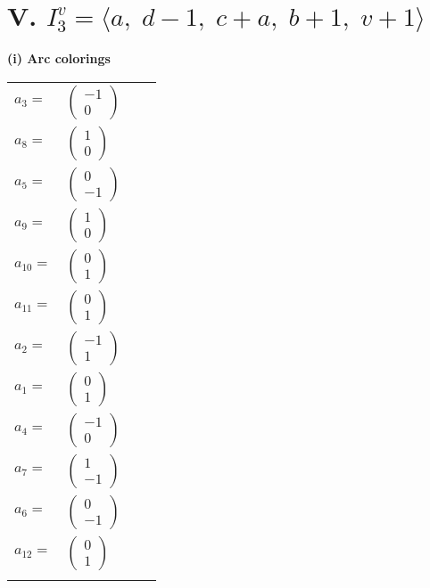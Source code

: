 \documentclass[1p]{elsarticle_modified}
\theoremstyle{definition}
\begin{document}
\centering \section*{V. $I^v_{3}= \langle a,\;d-1,\;c+a,\;b+1,\;v+1 \rangle$}
\flushleft \textbf{(i) Arc colorings}\\
\begin{tabular}{m{7pt} m{180pt} m{7pt} m{180pt} }
\flushright $a_{3}=$&$\begin{pmatrix}-1\\0\end{pmatrix}$ \\
\flushright $a_{8}=$&$\begin{pmatrix}1\\0\end{pmatrix}$ \\
\flushright $a_{5}=$&$\begin{pmatrix}0\\-1\end{pmatrix}$ \\
\flushright $a_{9}=$&$\begin{pmatrix}1\\0\end{pmatrix}$ \\
\flushright $a_{10}=$&$\begin{pmatrix}0\\1\end{pmatrix}$ \\
\flushright $a_{11}=$&$\begin{pmatrix}0\\1\end{pmatrix}$ \\
\flushright $a_{2}=$&$\begin{pmatrix}-1\\1\end{pmatrix}$ \\
\flushright $a_{1}=$&$\begin{pmatrix}0\\1\end{pmatrix}$ \\
\flushright $a_{4}=$&$\begin{pmatrix}-1\\0\end{pmatrix}$ \\
\flushright $a_{7}=$&$\begin{pmatrix}1\\-1\end{pmatrix}$ \\
\flushright $a_{6}=$&$\begin{pmatrix}0\\-1\end{pmatrix}$ \\
\flushright $a_{12}=$&$\begin{pmatrix}0\\1\end{pmatrix}$\\&\end{tabular}
\end{document}
